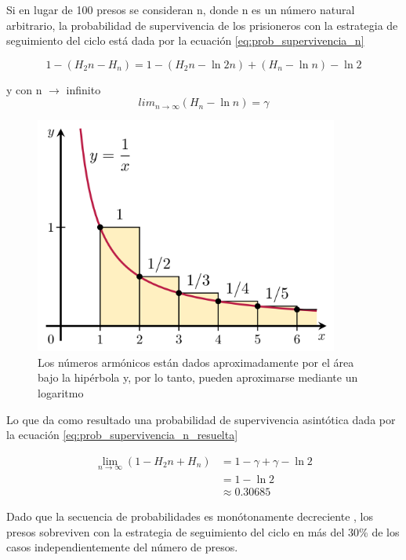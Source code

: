 Si en lugar de 100 presos se consideran n, donde n es un número natural arbitrario, la probabilidad de supervivencia de los prisioneros con la estrategia de seguimiento del ciclo está dada por la ecuación \ref{eq:prob_supervivencia_n}

\begin{equation}\label{eq:prob_supervivencia_n}
    1-(H_2n-H_n)=1-(H_2n-\ln 2n)+(H_n-\ln n) -\ln 2
\end{equation}

y con n $\to$ infinito
\begin{equation}\label{eq:prob_supervivencia_n_infinito}
lim_{n \to \infty} (H_n-\ln n)=\gamma
\end{equation}

\begin{figure}[H]
    \centering
    \includegraphics[width=10cm]{imagenes/Integral_Test.png}
    \caption{Los números armónicos están dados aproximadamente por el área bajo la hipérbola y, por lo tanto, pueden aproximarse mediante un logaritmo}
    \label{fig:gráfica de integrales}
\end{figure}

Lo que da como resultado una probabilidad de supervivencia asintótica dada por la ecuación \ref{eq:prob_supervivencia_n_resuelta}

\begin{equation}\label{eq:prob_supervivencia_n_resuelta}
    \begin{split}
        \lim_{n \to \infty} (1-H_2n+ H_n)&=1-\gamma+\gamma-\ln 2 \\
        &=1-\ln 2 \\
        &\approx0.30685
    \end{split} 
\end{equation}

Dado que la secuencia de probabilidades es monótonamente decreciente , los presos sobreviven con la estrategia de seguimiento del ciclo en más del 30\% de los casos independientemente del número de presos.